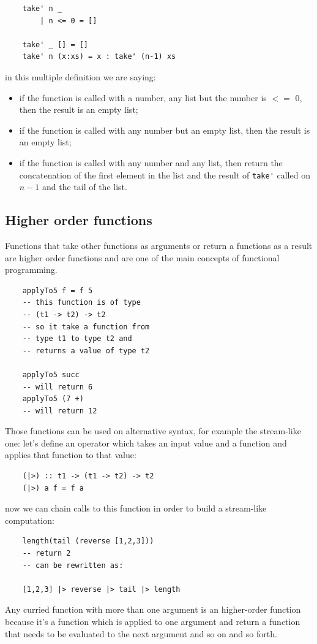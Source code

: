\begin{verbatim}
    take' n _
        | n <= 0 = []

    take' _ [] = []
    take' n (x:xs) = x : take' (n-1) xs
\end{verbatim}
in this multiple definition we are saying:
\begin{itemize}
    \item if the function is called with a number, any list but the number is $<=$ 0, then the result is an empty list;
    \item if the function is called with any number but an empty list, then the result is an empty list;
    \item if the function is called with any number and any list, then return the concatenation of the first element in the list and the result of \verb|take'| called on $n-1$ and the tail of the list.
\end{itemize}

\subsection{Higher order functions}
Functions that take other functions as arguments or return a functions as a result are higher order functions and are one of the main concepts of functional programming.
\begin{verbatim}
    applyTo5 f = f 5
    -- this function is of type
    -- (t1 -> t2) -> t2
    -- so it take a function from
    -- type t1 to type t2 and
    -- returns a value of type t2

    applyTo5 succ
    -- will return 6
    applyTo5 (7 +)
    -- will return 12
\end{verbatim}

Those functions can be used on alternative syntax, for example the stream-like one:
let's define an operator which takes an input value and a function and applies that function to that value:
\begin{verbatim}
    (|>) :: t1 -> (t1 -> t2) -> t2
    (|>) a f = f a
\end{verbatim}
now we can chain calls to this function in order to build a stream-like computation:
\begin{verbatim}
    length(tail (reverse [1,2,3]))
    -- return 2
    -- can be rewritten as:

    [1,2,3] |> reverse |> tail |> length
\end{verbatim}

Any curried function with more than one argument is an higher-order function because it's a function which is applied to one argument and return a function that needs to be evaluated to the next argument and so on and so forth.

